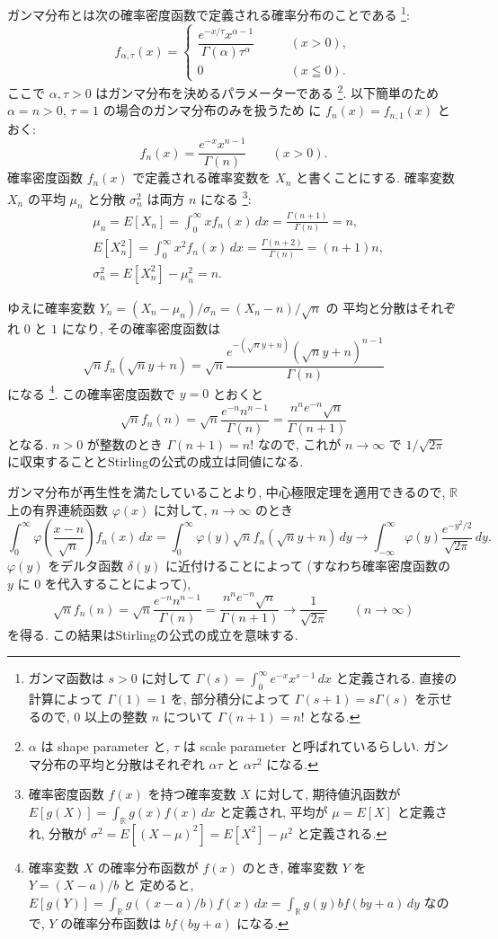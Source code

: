 \documentclass[12pt,twoside]{jarticle}
\newcommand\R{{\mathbb R}} %
\theoremstyle{jplain}
\theoremstyle{jplain}
\theoremstyle{jplain}
\numberwithin{theorem}{section}
\numberwithin{equation}{section}
\numberwithin{figure}{section}
\numberwithin{table}{section}
\begin{document}
ガンマ分布とは次の確率密度函数で定義される確率分布のことである%
\footnote{ガンマ函数は $s>0$ に対して 
$\Gamma(s)=\int_0^\infty e^{-x}x^{s-1}\,dx$ と定義される.
直接の計算によって $\Gamma(1)=1$ を, 
部分積分によって $\Gamma(s+1)=s\Gamma(s)$ を示せるので,
$0$ 以上の整数 $n$ について $\Gamma(n+1)=n!$ となる.}:
\[
f_{\alpha,\tau}(x) =
\begin{cases}
\dfrac{e^{-x/\tau}x^{\alpha-1}}{\Gamma(\alpha)\tau^\alpha} & \qquad (x>0), \\
0 & \qquad (x\leqq 0).
\end{cases}
\]
ここで $\alpha,\tau>0$ はガンマ分布を決めるパラメーターである%
\footnote{$\alpha$ は shape parameter と, 
$\tau$ は scale parameter と呼ばれているらしい.
ガンマ分布の平均と分散はそれぞれ $\alpha\tau$ と $\alpha\tau^2$ になる.}.
以下簡単のため $\alpha=n>0$, $\tau=1$ の場合のガンマ分布のみを扱うため
に $f_n(x)=f_{n,1}(x)$ とおく:
\[
f_n(x) = \frac{e^{-x} x^{n-1}}{\Gamma(n)} \qquad (x>0).
\]
確率密度函数 $f_n(x)$ で定義される確率変数を $X_n$ と書くことにする.
確率変数 $X_n$ の平均 $\mu_n$ と分散 $\sigma_n^2$ は両方 $n$ になる%
\footnote{確率密度函数 $f(x)$ を持つ確率変数 $X$ に対して, 
期待値汎函数が $E[g(X)]=\int_\R g(x)f(x)\,dx$ と定義され, 
平均が $\mu=E[X]$ と定義され, 
分散が $\sigma^2=E[(X-\mu)^2]=E[X^2]-\mu^2$ と定義される.}:
\begin{align*}
&
\mu_n = E[X_n] = \int_0^\infty x f_n(x)\,dx = \frac{\Gamma(n+1)}{\Gamma(n)}=n,
\\ & 
E[X_n^2] = \int_0^\infty x^2 f_n(x)\,dx = \frac{\Gamma(n+2)}{\Gamma(n)}=(n+1)n,
\\ &
\sigma_n^2 = E[X_n^2]-\mu_n^2 = n.
\end{align*}

ゆえに確率変数 $Y_n=(X_n-\mu_n)/\sigma_n=(X_n-n)/\sqrt{n}$ の
平均と分散はそれぞれ $0$ と $1$ になり, その確率密度函数は 
\[
\sqrt{n}f_n(\sqrt{n}y+n)
=
\sqrt{n}\frac{e^{-(\sqrt{n}y+n)}(\sqrt{n}y+n)^{n-1}}{\Gamma(n)}
\]
になる%
\footnote{確率変数 $X$ の確率分布函数が $f(x)$ のとき, 確率変数 $Y$ を $Y=(X-a)/b$ と
定めると, $E[g(Y)]=\int_\R g((x-a)/b)f(x)\,dx = \int_\R g(y) b f(by+a)\,dy$ なので,
$Y$ の確率分布函数は $b f(by+a)$ になる.}. 
この確率密度函数で $y=0$ とおくと
\[
\sqrt{n}f_n(n)
=
\sqrt{n}\frac{e^{-n}n^{n-1}}{\Gamma(n)}
=
\frac{n^n e^{-n}\sqrt{n}}{\Gamma(n+1)}
\]
となる. $n>0$ が整数のとき $\Gamma(n+1)=n!$ なので, 
これが $n\to\infty$ で $1/\sqrt{2\pi}$ に収束することとStirlingの公式の成立は同値になる.

ガンマ分布が再生性を満たしていることより, 
中心極限定理を適用できるので, 
$\R$ 上の有界連続函数 $\varphi(x)$ に対して, $n\to\infty$ のとき
\[
\int_0^\infty \varphi\left(\frac{x-n}{\sqrt{n}}\right)f_n(x)\,dx
=
\int_0^\infty \varphi(y)\sqrt{n}f_n(\sqrt{n}y+n)\,dy
\longrightarrow
\int_{-\infty}^\infty \varphi(y)\frac{e^{-y^2/2}}{\sqrt{2\pi}}\,dy.
\]
$\varphi(y)$ をデルタ函数 $\delta(y)$ に近付けることによって
(すなわち確率密度函数の $y$ に $0$ を代入することによって), 
\[
\sqrt{n}f_n(n)
=
\sqrt{n}\frac{e^{-n}n^{n-1}}{\Gamma(n)}
=
\frac{n^n e^{-n} \sqrt{n}}{\Gamma(n+1)}
\longrightarrow
\frac{1}{\sqrt{2\pi}}
\qquad(n\to\infty)
\]
を得る.
この結果はStirlingの公式の成立を意味する.
\end{document}
